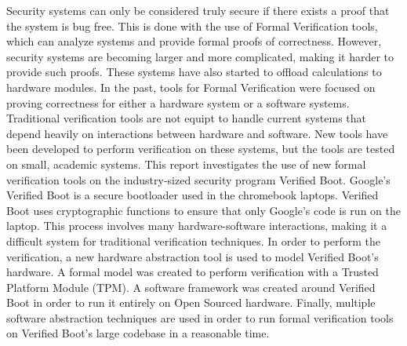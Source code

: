 Security systems can only be considered truly secure if there exists a proof that the system is bug free. 
This is done with the use of Formal Verification tools, which can analyze systems and provide formal proofs of correctness.
However, security systems are becoming larger and more complicated, making it harder to provide such proofs. 
These systems have also started to offload calculations to hardware modules.
In the past, tools for Formal Verification were focused on proving correctness for either a hardware system or a software systems.
Traditional verification tools are not equipt to handle current systems that depend heavily on interactions between hardware and software.
New tools have been developed to perform verification on these systems, but the tools are tested on small, academic systems.
This report investigates the use of new formal verification tools on the industry-sized security program Verified Boot.
Google's Verified Boot is a secure bootloader used in the chromebook laptops.
Verified Boot uses cryptographic functions to ensure that only Google's code is run on the laptop.
This process involves many hardware-software interactions, making it a difficult system for traditional verification techniques.
In order to perform the verification, a new hardware abstraction tool is used to model Verified Boot's hardware.
A formal model was created to perform verification with a Trusted Platform Module (TPM). 
A software framework was created around Verified Boot in order to run it entirely on Open Sourced hardware.
Finally, multiple software abstraction techniques are used in order to run formal verification tools on Verified Boot's large codebase in a reasonable time.
